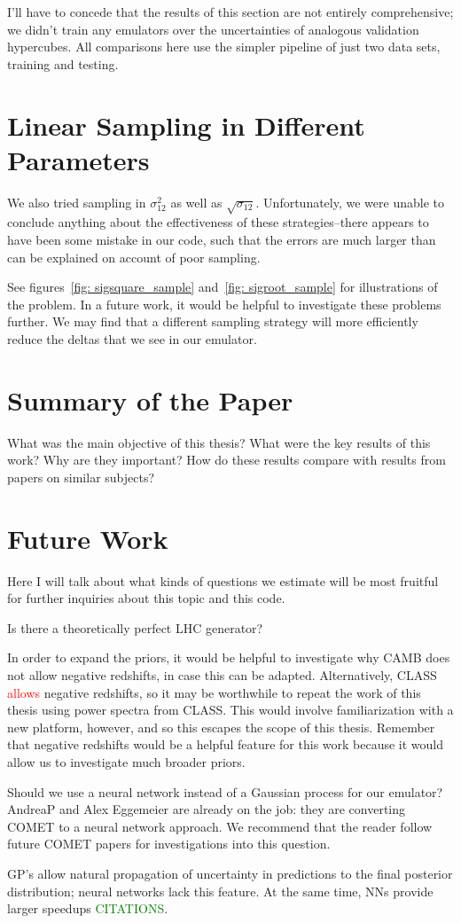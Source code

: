 I'll have to concede that the results of this section are not entirely comprehensive; we didn't train any emulators over the uncertainties of analogous validation hypercubes. All comparisons here use the simpler pipeline of just two data sets, training and testing.

\section{Linear Sampling in Different Parameters}

We also tried sampling in $\sigma_{12}^2$ as well as $\sqrt{\sigma_{12}}$.
Unfortunately, we were unable to conclude anything about the effectiveness of
these strategies--there appears to have been some mistake in our code, such
that the errors are much larger than can be explained on account of poor
sampling.

See figures~\ref{fig: sigsquare_sample} and~\ref{fig: sigroot_sample} for
illustrations of the problem. In a future work, it would be helpful to
investigate these problems further. We may find that a different sampling
strategy will more efficiently reduce the deltas that we see in our emulator.

\section{Summary of the Paper}

What was the main objective of this thesis? What were the key results of this work? Why are they important? How do these results compare with results from papers on similar subjects?

\section{Future Work}
\label{sec: future_work}

Here I will talk about what kinds of questions we estimate will be most fruitful for further inquiries about this topic and this code.

Is there a theoretically perfect LHC generator?

In order to expand the priors, it would be helpful to investigate why CAMB does not allow negative redshifts, in case this can be adapted. Alternatively, CLASS \textcolor{red}{allows} negative redshifts, so it may be worthwhile to repeat the work of this thesis using power spectra from CLASS. This would involve familiarization with a new platform, however, and so this escapes the scope of this thesis. Remember that negative redshifts would be a helpful feature for this work because it would allow us to investigate much broader priors.

Should we use a neural network instead of a Gaussian process for our emulator? AndreaP and Alex Eggemeier are already on the job: they are converting COMET to a neural network approach. We recommend that the reader follow future COMET papers for investigations into this question.

GP's allow natural propagation of
uncertainty in predictions to the final posterior distribution; neural
networks lack this feature. At the same time, NNs provide larger speedups \textcolor{green}{CITATIONS}.
